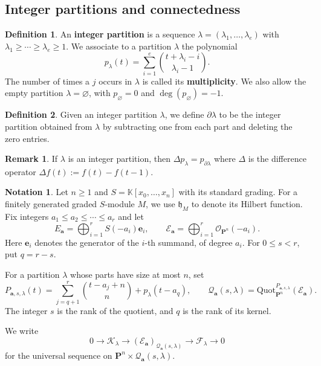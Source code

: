 \documentclass[leqno,11pt,a4paper]{amsart}
\theoremstyle{definition}
\newtheorem{notation}[notation]{Notation}
\newtheorem{remark}[remark]{Remark}
\newtheorem{definition}[definition]{Definition}
\numberwithin{equation}{section}
\newcommand{\kk}{\mathbb{K}}
\newcommand{\bfa}{\mathbf{a}}
\newcommand{\Quot}{\mathrm{Quot}}
\newcommand{\PP}{\mathbf{P}}
\newcommand{\mfh}{\mathfrak{h}}
\newcommand{\bfe}{\mathbf{e}}
\newcommand{\EE}{\mathscr{E}}
\newcommand{\FF}{\mathscr{F}}
\newcommand{\OO}{\mathscr{O}}
\newcommand{\KK}{\mathscr{K}}
\newcommand{\QQ}{\mathcal{Q}}
\begin{document}
\subsection{Integer partitions and connectedness}
\begin{definition}
An \textbf{integer partition} is a sequence $\lambda=(\lambda_1,\ldots,\lambda_e)$ with $\lambda_1\geq\cdots\geq\lambda_e\geq1$. 
We associate to a partition $\lambda$ the polynomial
$$
p_\lambda(t)=\sum_{i=1}^e\binom{t+\lambda_i-i}{\lambda_i-1}.
$$
The number of times a $j$ occurs in $\lambda$ is called its \textbf{multiplicity}.
We also allow the empty partition $\lambda=\varnothing$, with $p_\varnothing=0$ and $\deg(p_\varnothing)=-1$.
\end{definition}

\begin{definition} Given an integer partition $\lambda $, we define $\partial\lambda$ to be the integer partition obtained from $\lambda $ by subtracting one from each part and deleting the zero entries.

\end{definition}
\begin{remark} If $\lambda$ is an integer partition, then $\Delta p_\lambda = p_{\partial \lambda}$ where $\Delta$ is the difference operator $\Delta f(t) := f(t)-f(t-1)$.
\end{remark}


\begin{notation}\label{not:quot}
Let $n\geq 1$ and $S = \kk[x_0,\dots,x_n]$ with its standard grading. 
For a finitely generated graded $S$-module $M$, we use $\mfh_M$ to denote its Hilbert function.
Fix integers $a_1 \leq a_2 \leq \cdots \leq a_r$ and let
$$ 
E_{\bfa}=\bigoplus_{i=1}^r S(-a_i)\bfe_i, \qquad \EE_{\bfa}=\bigoplus_{i=1}^r\OO_{\PP^n}(-a_i).
$$
Here $\bfe_i$ denotes the generator of the $i$-th summand, of degree $a_i$.
For $0\leq s<r$, put $q=r-s$. 

For a partition $\lambda$ whose parts have size at most $n$, set
$$
P_{\bfa,s,\lambda}(t) = \sum_{j=q+1}^r\binom{t-a_j+n}{n}+p_\lambda(t-a_q), \qquad
\QQ_{\bfa}(s,\lambda) = \Quot^{P_{\bfa,s,\lambda}}_{\PP^n}(\EE_{\bfa}).
$$
The integer $s$ is the rank of the quotient, and $q$ is the rank of its kernel. 

We write 
$$
0 \longrightarrow \KK_\lambda \longrightarrow (\EE_\bfa)_{\QQ_{\bfa}(s,\lambda)} \longrightarrow \FF_\lambda \longrightarrow 0
$$
for the universal sequence on $\PP^n \times \QQ_{\bfa}(s,\lambda)$.
\end{notation}
\end{document}
